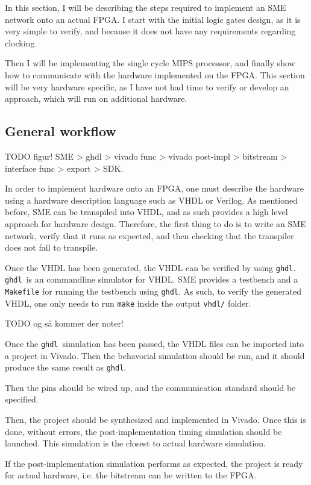 In this section, I will be describing the steps required to implement an SME
network onto an actual FPGA. I start with the initial logic gates design, as it
is very simple to verify, and because it does not have any requirements
regarding clocking.

Then I will be implementing the single cycle MIPS processor, and finally show
how to communicate with the hardware implemented on the FPGA. This section will
be very hardware specific, as I have not had time to verify or develop an
approach, which will run on additional hardware.

\subsection{General workflow}
TODO figur! SME > ghdl > vivado func > vivado post-impl > bitstream > interface func >
export > SDK.

In order to implement hardware onto an FPGA, one must describe the hardware
using a hardware description language such as VHDL or Verilog. As mentioned
before, SME can be transpiled into VHDL, and as such provides a high level
approach for hardware design. Therefore, the first thing to do is to write an
SME network, verify that it runs as expected, and then checking that the
transpiler does not fail to transpile.

Once the VHDL has been generated, the VHDL can be verified by using
\texttt{ghdl}. \texttt{ghdl} is an commandline simulator for VHDL. SME provides
a testbench and a \texttt{Makefile} for running the testbench using
\texttt{ghdl}. As such, to verify the generated VHDL, one only needs to run
\texttt{make} inside the output \texttt{vhdl/} folder.

TODO og så kommer der noter!

Once the \texttt{ghdl} simulation has been passed, the VHDL files can be
imported into a project in Vivado. Then the behavorial simulation should be
run, and it should produce the same result as \texttt{ghdl}.

Then the pins should be wired up, and the communication standard should be
specified.

Then, the project should be synthesized and implemented in Vivado. Once this is
done, without errors, the post-implementation timing simulation should be launched.
This simulation is the closest to actual hardware simulation.

If the post-implementation simulation performs as expected, the project is
ready for actual hardware, i.e. the bitstream can be written to the FPGA.

